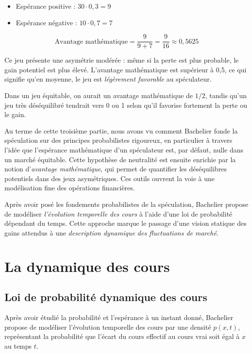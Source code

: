 \documentclass[12pt,a4paper]{article}
\begin{document}
\medskip

\begin{itemize}
    \item Espérance positive : $30 \cdot 0{,}3 = 9$
    \item Espérance négative : $10 \cdot 0{,}7 = 7$
\end{itemize}

\[
\text{Avantage mathématique} = \frac{9}{9 + 7} = \frac{9}{16} \approx 0{,}5625
\]

\medskip

Ce jeu présente une asymétrie modérée : même si la perte est plus probable, le gain potentiel est plus élevé. L’avantage mathématique est supérieur à 0{,}5, ce qui signifie qu’en moyenne, le jeu est \emph{légèrement favorable} au spéculateur.

Dans un jeu équitable, on aurait un avantage mathématique de $1/2$, tandis qu’un jeu très déséquilibré tendrait vers 0 ou 1 selon qu’il favorise fortement la perte ou le gain.

\bigskip

Au terme de cette troisième partie, nous avons vu comment Bachelier fonde la spéculation sur des principes probabilistes rigoureux, en particulier à travers l’idée que l’espérance mathématique d’un spéculateur est, par défaut, nulle dans un marché équitable. Cette hypothèse de neutralité est ensuite enrichie par la notion d’\emph{avantage mathématique}, qui permet de quantifier les déséquilibres potentiels dans des jeux asymétriques. Ces outils ouvrent la voie à une modélisation fine des opérations financières.

Après avoir posé les fondements probabilistes de la spéculation, Bachelier propose de modéliser \textit{l’évolution temporelle des cours} à l’aide d’une loi de probabilité dépendant du temps. Cette approche marque le passage d’une vision statique des gains attendus à une \textit{description dynamique des fluctuations de marché}.

\section{La dynamique des cours}

\subsection{Loi de probabilité dynamique des cours}

Après avoir étudié la probabilité et l’espérance à un instant donné, Bachelier propose de modéliser l’évolution temporelle des cours par une densité \( p(x,t) \), représentant la probabilité que l’écart du cours effectif au cours vrai soit égal à \( x \) au temps \( t \).
\end{document}
